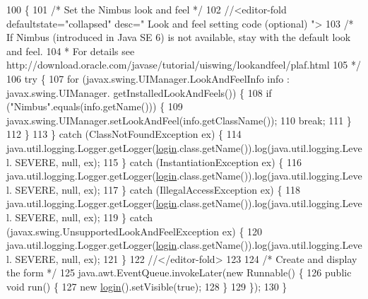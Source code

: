 \begin{DoxyCode}
100                                            \{
101         \textcolor{comment}{/* Set the Nimbus look and feel */}
102         \textcolor{comment}{//<editor-fold defaultstate="collapsed" desc=" Look and feel setting code (optional) ">}
103         \textcolor{comment}{/* If Nimbus (introduced in Java SE 6) is not available, stay with the default look and feel.}
104 \textcolor{comment}{         * For details see http://download.oracle.com/javase/tutorial/uiswing/lookandfeel/plaf.html }
105 \textcolor{comment}{         */}
106         \textcolor{keywordflow}{try} \{
107             \textcolor{keywordflow}{for} (javax.swing.UIManager.LookAndFeelInfo info : javax.swing.UIManager.
      getInstalledLookAndFeels()) \{
108                 \textcolor{keywordflow}{if} (\textcolor{stringliteral}{"Nimbus"}.equals(info.getName())) \{
109                     javax.swing.UIManager.setLookAndFeel(info.getClassName());
110                     \textcolor{keywordflow}{break};
111                 \}
112             \}
113         \} \textcolor{keywordflow}{catch} (ClassNotFoundException ex) \{
114             java.util.logging.Logger.getLogger(\mbox{\hyperlink{classsoftware_1_1login_a2169a57b945dc943e960524f043745cc}{login}}.class.getName()).log(java.util.logging.Level.
      SEVERE, null, ex);
115         \} \textcolor{keywordflow}{catch} (InstantiationException ex) \{
116             java.util.logging.Logger.getLogger(\mbox{\hyperlink{classsoftware_1_1login_a2169a57b945dc943e960524f043745cc}{login}}.class.getName()).log(java.util.logging.Level.
      SEVERE, null, ex);
117         \} \textcolor{keywordflow}{catch} (IllegalAccessException ex) \{
118             java.util.logging.Logger.getLogger(\mbox{\hyperlink{classsoftware_1_1login_a2169a57b945dc943e960524f043745cc}{login}}.class.getName()).log(java.util.logging.Level.
      SEVERE, null, ex);
119         \} \textcolor{keywordflow}{catch} (javax.swing.UnsupportedLookAndFeelException ex) \{
120             java.util.logging.Logger.getLogger(\mbox{\hyperlink{classsoftware_1_1login_a2169a57b945dc943e960524f043745cc}{login}}.class.getName()).log(java.util.logging.Level.
      SEVERE, null, ex);
121         \}
122         \textcolor{comment}{//</editor-fold>}
123 
124         \textcolor{comment}{/* Create and display the form */}
125         java.awt.EventQueue.invokeLater(\textcolor{keyword}{new} Runnable() \{
126             \textcolor{keyword}{public} \textcolor{keywordtype}{void} run() \{
127                 \textcolor{keyword}{new} \mbox{\hyperlink{classsoftware_1_1login_a2169a57b945dc943e960524f043745cc}{login}}().setVisible(\textcolor{keyword}{true});
128             \}
129         \});
130     \}
\end{DoxyCode}


